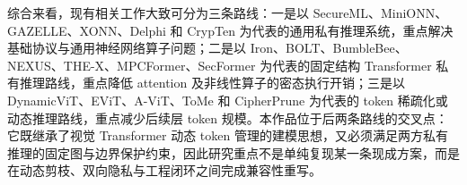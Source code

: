 综合来看，现有相关工作大致可分为三条路线：一是以 SecureML、MiniONN、GAZELLE、XONN、Delphi 和 CrypTen 为代表的通用私有推理系统，重点解决基础协议与通用神经网络算子问题；二是以 Iron、BOLT、BumbleBee、NEXUS、THE-X、MPCFormer、SecFormer 为代表的固定结构 Transformer 私有推理路线，重点降低 attention 及非线性算子的密态执行开销；三是以 DynamicViT、EViT、A-ViT、ToMe 和 CipherPrune 为代表的 token 稀疏化或动态推理路线，重点减少后续层 token 规模。本作品位于后两条路线的交叉点：它既继承了视觉 Transformer 动态 token 管理的建模思想，又必须满足两方私有推理的固定图与边界保护约束，因此研究重点不是单纯复现某一条现成方案，而是在动态剪枝、双向隐私与工程闭环之间完成兼容性重写。
